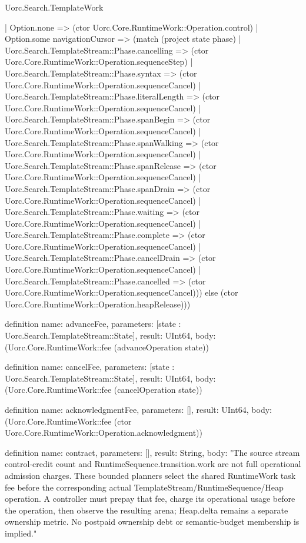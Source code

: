 \begin{lexlean}{Uorc.Search.TemplateWork}
\begin{semanticmodule}
{      | Option.none => (ctor Uorc.Core.RuntimeWork::Operation.control)
      | Option.some navigationCursor => (match (project state phase)
        | Uorc.Search.TemplateStream::Phase.cancelling => (ctor Uorc.Core.RuntimeWork::Operation.sequenceStep)
        | Uorc.Search.TemplateStream::Phase.syntax => (ctor Uorc.Core.RuntimeWork::Operation.sequenceCancel)
        | Uorc.Search.TemplateStream::Phase.literalLength => (ctor Uorc.Core.RuntimeWork::Operation.sequenceCancel)
        | Uorc.Search.TemplateStream::Phase.spanBegin => (ctor Uorc.Core.RuntimeWork::Operation.sequenceCancel)
        | Uorc.Search.TemplateStream::Phase.spanWalking => (ctor Uorc.Core.RuntimeWork::Operation.sequenceCancel)
        | Uorc.Search.TemplateStream::Phase.spanRelease => (ctor Uorc.Core.RuntimeWork::Operation.sequenceCancel)
        | Uorc.Search.TemplateStream::Phase.spanDrain => (ctor Uorc.Core.RuntimeWork::Operation.sequenceCancel)
        | Uorc.Search.TemplateStream::Phase.waiting => (ctor Uorc.Core.RuntimeWork::Operation.sequenceCancel)
        | Uorc.Search.TemplateStream::Phase.complete => (ctor Uorc.Core.RuntimeWork::Operation.sequenceCancel)
        | Uorc.Search.TemplateStream::Phase.cancelDrain => (ctor Uorc.Core.RuntimeWork::Operation.sequenceCancel)
        | Uorc.Search.TemplateStream::Phase.cancelled => (ctor Uorc.Core.RuntimeWork::Operation.sequenceCancel))) else (ctor Uorc.Core.RuntimeWork::Operation.heapRelease)))
}

definition{
  name: advanceFee,
  parameters: [state : Uorc.Search.TemplateStream::State],
  result: UInt64,
  body: (Uorc.Core.RuntimeWork::fee (advanceOperation state))
}

definition{
  name: cancelFee,
  parameters: [state : Uorc.Search.TemplateStream::State],
  result: UInt64,
  body: (Uorc.Core.RuntimeWork::fee (cancelOperation state))
}

definition{
  name: acknowledgmentFee,
  parameters: [],
  result: UInt64,
  body: (Uorc.Core.RuntimeWork::fee (ctor Uorc.Core.RuntimeWork::Operation.acknowledgment))
}

definition{
  name: contract,
  parameters: [],
  result: String,
  body: "The source stream control-credit count and RuntimeSequence.transition.work are not full operational admission charges. These bounded planners select the shared RuntimeWork task fee before the corresponding actual TemplateStream/RuntimeSequence/Heap operation. A controller must prepay that fee, charge its operational usage before the operation, then observe the resulting arena; Heap.delta remains a separate ownership metric. No postpaid ownership debt or semantic-budget membership is implied."
}
\end{semanticmodule}
\end{lexlean}
